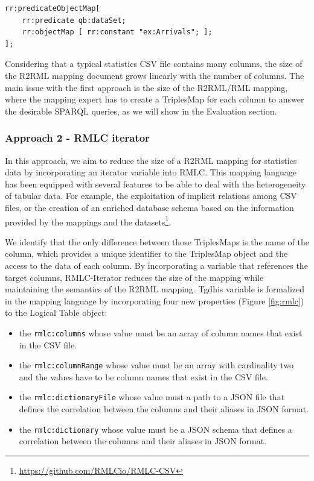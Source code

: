 \begin{lstlisting}[float,caption=Dataset mapping,frame=tlrb,label={list:dataset}, columns=fullflexible]
rr:predicateObjectMap[ 
    rr:predicate qb:dataSet; 
    rr:objectMap [ rr:constant "ex:Arrivals"; ];
];
\end{lstlisting}

Considering that a typical statistics CSV file contains many columns, the size of the R2RML mapping document grows linearly with the number of columns. The main issue with the first approach is the size of the R2RML/RML mapping, where the mapping expert has to create a TriplesMap for each column to answer the desirable SPARQL queries, as we will show in the Evaluation section.

\subsubsection{Approach 2 - RMLC iterator}
In this approach, we aim to reduce the size of a R2RML mapping for statistics data by incorporating an iterator variable into RMLC. This mapping language has been equipped with several features to be able to deal with the heterogeneity of tabular data. For example, the exploitation of implicit relations among CSV files, or the creation of an enriched database schema based on the information provided by the mappings and the datasets\footnote{\url{https://github.com/RMLCio/RMLC-CSV}}.

We identify that the only difference between those TriplesMaps is the name of the column, which provides a unique identifier to the TriplesMap object and the access to the data of each column. By incorporating a variable that references the target columns, RMLC-Iterator reduces the size of the mapping while maintaining the semantics of the R2RML mapping. Tgdhis variable is formalized in the mapping language by incorporating four new properties (Figure \ref{fig:rmlc}) to the Logical Table object:
\begin{itemize}
\item the \texttt{rmlc:columns} whose value must be an array of column names that exist in the CSV file.
\item the \texttt{rmlc:columnRange} whose value must be an array with cardinality two and the values have to be column names that exist in the CSV file.
\item the \texttt{rmlc:dictionaryFile} whose value must a path to a JSON file that defines the correlation between the columns and their aliases in JSON format.
\item the \texttt{rmlc:dictionary} whose value must be a JSON schema that defines a correlation between the columns and their aliases in JSON format.
\end{itemize}

